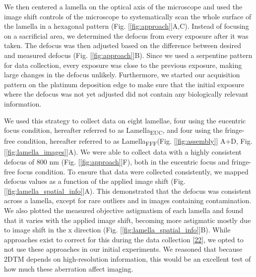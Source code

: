 \documentclass[
]{article}
\begin{document}
We then centered a lamella on the optical axis of the microscope and used the
image shift controls of the microscope to systematically scan the whole surface
of the lamella in a hexagonal pattern (Fig. {[}\ref{fig:approach}{]}A,C). Instead of
focusing on a sacrificial area, we determined the defocus from every exposure
after it was taken. The defocus was then adjusted based on the difference
between desired and measured defocus (Fig. {[}\ref{fig:approach}{]}B). Since we used a
serpentine pattern for data collection, every exposure was close to the previous
exposure, making large changes in the defocus unlikely. Furthermore, we started
our acquisition pattern on the platinum deposition edge to make sure that the
initial exposure where the defocus was not yet adjusted did not contain any
biologically relevant information.

We used this strategy to collect data on eight lamellae, four using the
eucentric focus condition, hereafter referred to as Lamella\textsubscript{EUC}, and four using
the fringe-free condition, hereafter referred to as Lamella\textsubscript{FFF}(Fig.
{[}\ref{fig:assembly}{]} A+D, Fig.
{[}\ref{fig:lamella_images}{]}A). We were able to collect data with a highly
consistent defocus of 800 nm (Fig. {[}\ref{fig:approach}{]}F), both in the eucentric
focus and fringe-free focus condition. To ensure that data were collected
consistently, we mapped defocus values as a function of the applied image shift
(Fig. {[}\ref{fig:lamella_spatial_info}{]}A). This demonstrated that the defocus was
consistent across a lamella, except for rare outliers and in images containing
contamination. We also plotted the measured objective astigmatism of each
lamella and found that it varies with the applied image shift, becoming more
astigmatic mostly due to image shift in the x direction (Fig.
{[}\ref{fig:lamella_spatial_info}{]}B). While approaches exist to correct for this
during the data collection {[}\protect\hyperlink{ref-APSL9LmU}{22}{]}, we opted to not use these approaches in our
initial experiments. We reasoned that because 2DTM depends on high-resolution
information, this would be an excellent test of how much these aberration affect
imaging.
\end{document}
